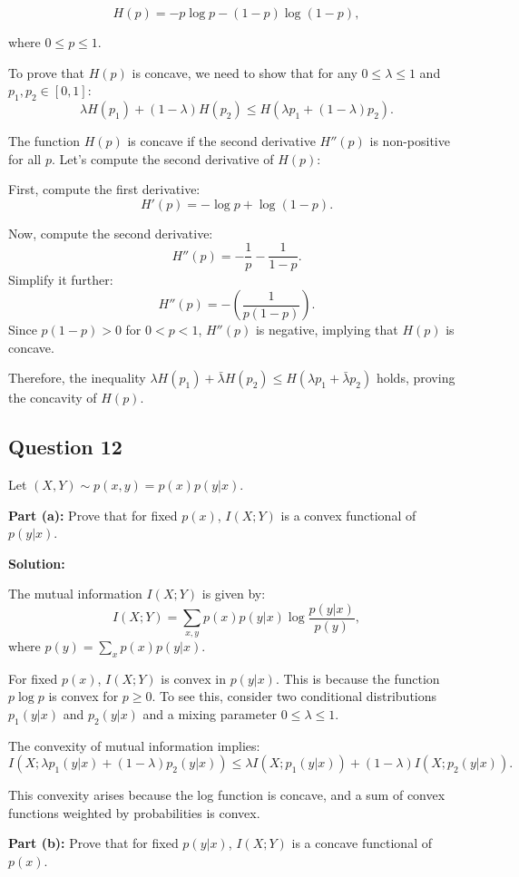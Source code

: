 \documentclass[a4paper,10pt]{article}
\begin{document}
$$
H(p) = -p \log p - (1-p) \log (1-p),
$$

where $ 0 \leq p \leq 1 $.

To prove that $ H(p) $ is concave, we need to show that for any $ 0 \leq \lambda \leq 1 $ and $ p_1, p_2 \in [0,1] $:
$$
\lambda H(p_1) + (1-\lambda) H(p_2) \leq H(\lambda p_1 + (1-\lambda)p_2).
$$

The function $ H(p) $ is concave if the second derivative $ H''(p) $ is non-positive for all $ p $. Let's compute the second derivative of $ H(p) $:

First, compute the first derivative:
$$
H'(p) = -\log p + \log (1-p).
$$

Now, compute the second derivative:
$$
H''(p) = -\frac{1}{p} - \frac{1}{1-p}.
$$
Simplify it further:
$$
H''(p) = -\left(\frac{1}{p(1-p)}\right).
$$
Since $ p(1-p) > 0 $ for $ 0 < p < 1 $, $ H''(p) $ is negative, implying that $ H(p) $ is concave.

Therefore, the inequality $ \lambda H(p_1) + \bar{\lambda} H(p_2) \leq H(\lambda p_1 + \bar{\lambda} p_2) $ holds, proving the concavity of $ H(p) $.


\subsection*{Question 12}
Let $ (X,Y) \sim p(x,y) = p(x)p(y|x) $.

\textbf{Part (a):} Prove that for fixed $ p(x) $, $ I(X;Y) $ is a convex functional of $ p(y|x) $.

\textbf{Solution:}

The mutual information $ I(X;Y) $ is given by:
$$
I(X;Y) = \sum_{x,y} p(x) p(y|x) \log \frac{p(y|x)}{p(y)},
$$
where $ p(y) = \sum_{x} p(x) p(y|x) $.

For fixed $ p(x) $, $ I(X;Y) $ is convex in $ p(y|x) $. This is because the function $ p \log p $ is convex for $ p \geq 0 $. To see this, consider two conditional distributions $ p_1(y|x) $ and $ p_2(y|x) $ and a mixing parameter $ 0 \leq \lambda \leq 1 $.

The convexity of mutual information implies:
$$
I(X; \lambda p_1(y|x) + (1-\lambda) p_2(y|x)) \leq \lambda I(X; p_1(y|x)) + (1-\lambda) I(X; p_2(y|x)).
$$

This convexity arises because the log function is concave, and a sum of convex functions weighted by probabilities is convex.

\textbf{Part (b):} Prove that for fixed $ p(y|x) $, $ I(X;Y) $ is a concave functional of $ p(x) $.
\end{document}
